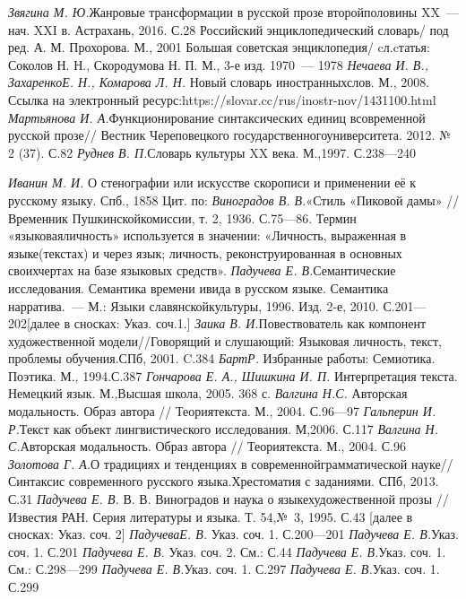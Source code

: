\textit{Звягина М. Ю.}{Жанровые трансформации в русской прозе второйполовины XX~--- нач. XXI в. Астрахань, 2016. С.28}
Российский энциклопедический словарь/ под ред. А. М. Прохорова. М., 2001 
Большая советская энциклопедия/ cл.cтатья: Соколов Н. Н., Скородумова Н. П. М., 3-е изд. 1970~--- 1978
\textit{{Нечаева И. В., ЗахаренкоЕ. Н., Комарова Л. Н. }}{Новый словарь иностранныхслов. М., 2008. Ссылка на электронный ресурс:https://slovar.cc/rus/inostr-nov/1431100.html}
\textit{{Мартьянова И. А.}}{Функционирование синтаксических единиц всовременной русской прозе// Вестник Череповецкого государственногоуниверситета. 2012. № 2 (37). С.82}
\textit{{ Руднев В. П.}}{Словарь культуры XX века. М.,1997. С.238—240 }

\textit{Иванин М. И. }О стенографии или искусстве скорописи и применении её к русскому языку. Спб., 1858
 Цит. по:
\textit{{Виноградов В. В.}}{«Стиль «Пиковой дамы» // Временник Пушкинскойкомиссии, т. 2, 1936. С.75—86.}
Термин «языковаяличность» используется в значении: «Личность, выраженная в языке(текстах) и через язык; личность, реконструированная в основных своихчертах на базе языковых средств». 
\textit{{Падучева Е. В.}}{Семантические исследования. Семантика времени ивида в русском языке. Семантика нарратива.~--- М.: Языки славянскойкультуры, 1996. Изд. 2-е, 2010. С.201—202[далее в сносках: Указ. соч.1.]}
\textit{{Заика В. И.}}{Повествователь как компонент художественной модели//Говорящий и слушающий: Языковая личность, текст, проблемы обучения.СПб, 2001. C.384}
\textit{{БартР.}}{ Избранные работы: Семиотика. Поэтика. М., 1994.С.387}
\textit{{Гончарова Е. А., Шишкина И. П. }}{Интерпретация текста. Немецкий язык. М.,Высшая школа, 2005. 368 с. }
\textit{{Валгина Н.С. }}{Авторская модальность. Образ автора // Теориятекста. М., 2004. С.96—97}
\textit{{Гальперин И. Р.}}{Текст как объект лингвистического исследования. М,2006. С.117}
\textit{{Валгина Н. С.}}{Авторская модальность. Образ автора // Теориятекста. М., 2004. С.96}
\textit{{Золотова Г. А.}}{О традициях и тенденциях в современнойграмматической науке//Синтаксис современного русского языка.Хрестоматия с заданиями. СПб, 2013. С.31}
\textit{{Падучева Е. В. }}{В. В. Виноградов и наука о языкехудожественной прозы // Известия РАН. Серия литературы и языка. Т. 54,№ 3, 1995. С.43 [далее в сносках: Указ. соч. 2]}
\textit{{ ПадучеваЕ. В. }}{Указ. соч. 1. С.200—201}
\textit{{ Падучева Е. В.}}{Указ. соч. 1. С.201}
\textit{{Падучева Е. В. }}{Указ. соч. 2. См.: С.44}
\textit{{ Падучева Е. В.}}{Указ. соч. 1. См.: С.298—299}
\textit{{ Падучева Е. В.}}{Указ. соч. 1. С.297}
\textit{{ Падучева Е. В.}}{Указ. соч. 1. С.299}
